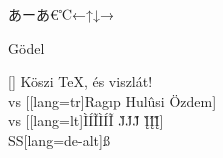 \documentclass{article}
\begin{document}
\ttfamily
あーあ€℃←↑↓→\textyen\textcent\textsterling\textsection\textbrokenbar

Gödel

[\fontname\font] Köszi {\TeX}, és viszlát!\\

\noindent{} vs [\MakeUppercase[lang=tr]{Ragıp Hulûsi Özdem}]\\
[\MakeLowercase{ÌÍĨÌÍĨJ̀J́J̃ Į̀Į́Į̃ }] vs [\MakeLowercase[lang=lt]{ÌÍĨÌÍĨ J̀J́J̃ Į̀Į́Į̃}]\\
\MakeUppercase{ß}\MakeUppercase[lang=de-alt]{ß}
\end{document}
